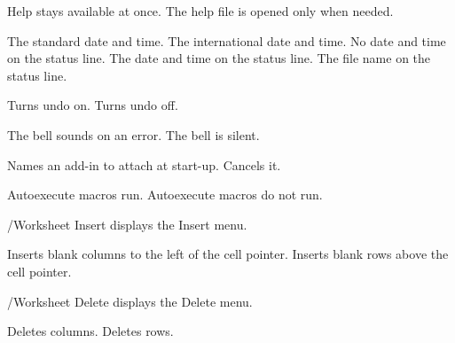 \begin{Options}
 Help stays available at once.
 The help file is opened only when
  needed.
\end{Options}
\begin{Options}
 The standard date and time.
 The international date and time.
 No date and time on the status line.
 The date and time on the status line.
 The file name on the status line.
\end{Options}
\begin{Options}
 Turns undo on.
 Turns undo off.
\end{Options}
\begin{Options}
 The bell sounds on an error.
 The bell is silent.
\end{Options}
\begin{Options}
 Names an add-in to attach at start-up.
 Cancels it.
\end{Options}
\begin{Options}
 Autoexecute macros run.
 Autoexecute macros do not run.
\end{Options}

/Worksheet Insert displays the Insert menu.
\begin{Options}
 Inserts blank columns to the left of
  the cell pointer.
 Inserts blank rows above the cell
  pointer.
\end{Options}

/Worksheet Delete displays the Delete menu.
\begin{Options}
 Deletes columns.
 Deletes rows.
\end{Options}

